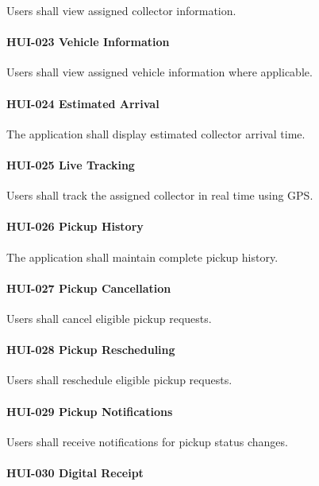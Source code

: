 Users shall view assigned collector information.

\paragraph{HUI-023 Vehicle Information}

Users shall view assigned vehicle information where applicable.

\paragraph{HUI-024 Estimated Arrival}

The application shall display estimated collector arrival time.

\paragraph{HUI-025 Live Tracking}

Users shall track the assigned collector in real time using GPS.

\paragraph{HUI-026 Pickup History}

The application shall maintain complete pickup history.

\paragraph{HUI-027 Pickup Cancellation}

Users shall cancel eligible pickup requests.

\paragraph{HUI-028 Pickup Rescheduling}

Users shall reschedule eligible pickup requests.

\paragraph{HUI-029 Pickup Notifications}

Users shall receive notifications for pickup status changes.

\paragraph{HUI-030 Digital Receipt}

